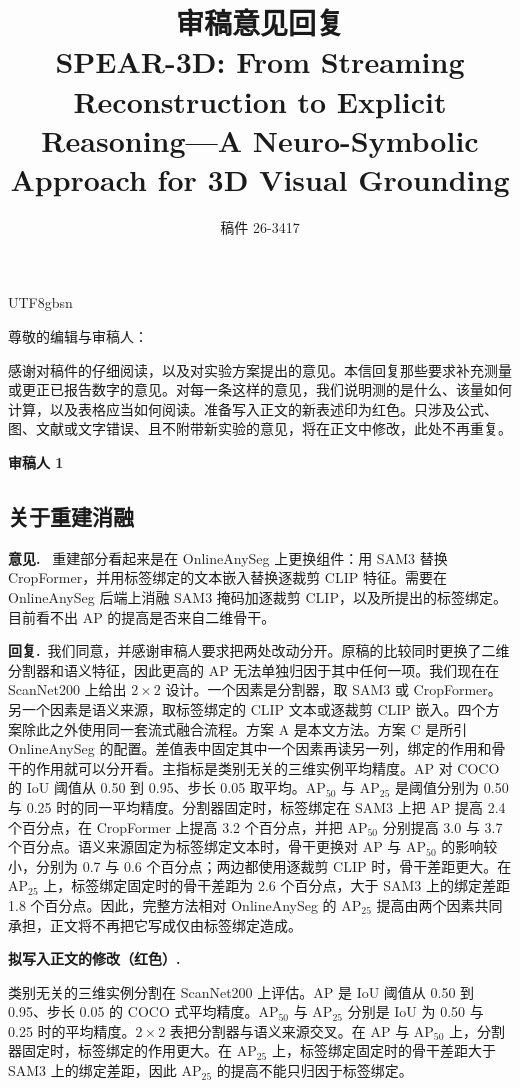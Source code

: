\documentclass[11pt]{article}
\title{\textbf{审稿意见回复}\\[0.4em]
\large SPEAR-3D: From Streaming Reconstruction to Explicit Reasoning---A Neuro-Symbolic Approach for 3D Visual Grounding}
\author{}
\date{稿件 26-3417}
\newcommand{\revcomment}[1]{%
  \par\vspace{0.6em}\noindent\textcolor{revblue}{\textbf{意见.}}\ %
  \textcolor{revblue}{#1}\par\vspace{0.4em}}
\newcommand{\revresponse}[1]{%
  \par\noindent\textbf{回复.}\ #1\par\vspace{0.3em}}
\newcommand{\revchange}[1]{%
  \par\noindent\textbf{拟写入正文的修改（红色）.}\par
  \noindent\textcolor{revred}{#1}\par\vspace{0.8em}}
\begin{document}
\begin{CJK*}{UTF8}{gbsn}
\maketitle
\thispagestyle{empty}

\noindent 尊敬的编辑与审稿人：

\medskip
\noindent 感谢对稿件的仔细阅读，以及对实验方案提出的意见。本信回复那些要求补充测量或更正已报告数字的意见。对每一条这样的意见，我们说明测的是什么、该量如何计算，以及表格应当如何阅读。准备写入正文的新表述印为红色。只涉及公式、图、文献或文字错误、且不附带新实验的意见，将在正文中修改，此处不再重复。

\bigskip
\noindent\textcolor{revblue}{\large\textbf{审稿人 1}}

\subsection*{关于重建消融}

\revcomment{重建部分看起来是在 OnlineAnySeg 上更换组件：用 SAM3 替换 CropFormer，并用标签绑定的文本嵌入替换逐裁剪 CLIP 特征。需要在 OnlineAnySeg 后端上消融 SAM3 掩码加逐裁剪 CLIP，以及所提出的标签绑定。目前看不出 AP 的提高是否来自二维骨干。}

\revresponse{我们同意，并感谢审稿人要求把两处改动分开。原稿的比较同时更换了二维分割器和语义特征，因此更高的 AP 无法单独归因于其中任何一项。我们现在在 ScanNet200 上给出 \(2\times 2\) 设计。一个因素是分割器，取 SAM3 或 CropFormer。另一个因素是语义来源，取标签绑定的 CLIP 文本或逐裁剪 CLIP 嵌入。四个方案除此之外使用同一套流式融合流程。方案 A 是本文方法。方案 C 是所引 OnlineAnySeg 的配置。差值表中固定其中一个因素再读另一列，绑定的作用和骨干的作用就可以分开看。主指标是类别无关的三维实例平均精度。AP 对 COCO 的 IoU 阈值从 0.50 到 0.95、步长 0.05 取平均。AP\(_{50}\) 与 AP\(_{25}\) 是阈值分别为 0.50 与 0.25 时的同一平均精度。分割器固定时，标签绑定在 SAM3 上把 AP 提高 2.4 个百分点，在 CropFormer 上提高 3.2 个百分点，并把 AP\(_{50}\) 分别提高 3.0 与 3.7 个百分点。语义来源固定为标签绑定文本时，骨干更换对 AP 与 AP\(_{50}\) 的影响较小，分别为 0.7 与 0.6 个百分点；两边都使用逐裁剪 CLIP 时，骨干差距更大。在 AP\(_{25}\) 上，标签绑定固定时的骨干差距为 2.6 个百分点，大于 SAM3 上的绑定差距 1.8 个百分点。因此，完整方法相对 OnlineAnySeg 的 AP\(_{25}\) 提高由两个因素共同承担，正文将不再把它写成仅由标签绑定造成。}

\revchange{类别无关的三维实例分割在 ScanNet200 上评估。AP 是 IoU 阈值从 0.50 到 0.95、步长 0.05 的 COCO 式平均精度。AP\(_{50}\) 与 AP\(_{25}\) 分别是 IoU 为 0.50 与 0.25 时的平均精度。\(2\times 2\) 表把分割器与语义来源交叉。在 AP 与 AP\(_{50}\) 上，分割器固定时，标签绑定的作用更大。在 AP\(_{25}\) 上，标签绑定固定时的骨干差距大于 SAM3 上的绑定差距，因此 AP\(_{25}\) 的提高不能只归因于标签绑定。}


\end{CJK*}
\end{document}

